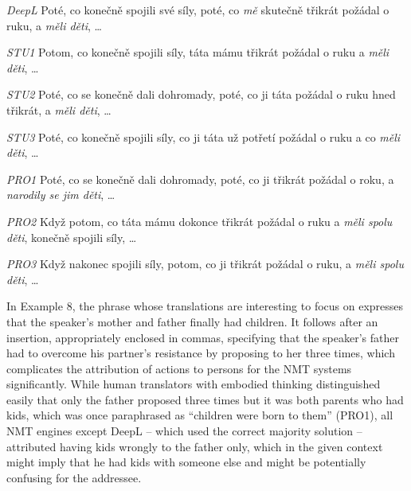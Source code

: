 \documentclass[output=paper]{langscibook}
\begin{document}
\textit{DeepL} Poté, co konečně spojili své síly, poté, co \textit{mě} skutečně třikrát požádal o ruku, a \textit{měli děti}, …

\textit{STU1} Potom, co konečně spojili síly, táta mámu třikrát požádal o ruku a \textit{měli děti}, …

\textit{STU2} Poté, co se konečně dali dohromady, poté, co ji táta požádal o ruku hned třikrát, a \textit{měli děti}, …

\textit{STU3} Poté, co konečně spojili síly, co ji táta už potřetí požádal o ruku a co \textit{měli děti}, …

\textit{PRO1} Poté, co se konečně dali dohromady, poté, co ji třikrát požádal o roku, a \textit{narodily se jim děti}, …

\textit{PRO2} Když potom, co táta mámu dokonce třikrát požádal o ruku a \textit{měli spolu děti}, konečně spojili síly, …

\textit{PRO3} Když nakonec spojili síly, potom, co ji třikrát požádal o ruku, a \textit{měli spolu děti}, …

\z
In Example 8, the phrase whose translations are interesting to focus on expresses that the speaker’s mother and father finally had children. It follows after an insertion, appropriately enclosed in commas, specifying that the speaker’s father had to overcome his partner’s resistance by proposing to her three times, which complicates the attribution of actions to persons for the NMT systems significantly. While human translators with embodied thinking distinguished easily that only the father proposed three times but it was both parents who had kids, which was once paraphrased as “children were born to them” (PRO1), all NMT engines except DeepL – which used the correct majority solution – attributed having kids wrongly to the father only, which in the given context might imply that he had kids with someone else and might be potentially confusing for the addressee.
\end{document}
